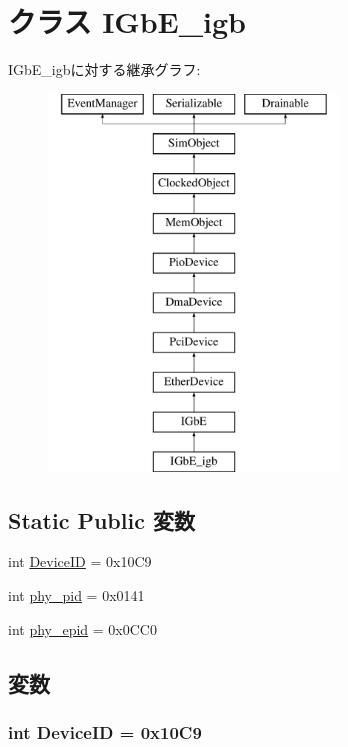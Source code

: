 \hypertarget{classEthernet_1_1IGbE__igb}{
\section{クラス IGbE\_\-igb}
\label{classEthernet_1_1IGbE__igb}
}
IGbE\_\-igbに対する継承グラフ:\begin{figure}[H]
\begin{center}
\leavevmode
\includegraphics[height=10cm]{classEthernet_1_1IGbE__igb}
\end{center}
\end{figure}
\subsection*{Static Public 変数}
\begin{DoxyCompactItemize}
\item 
int \hyperlink{classEthernet_1_1IGbE__igb_a4a8ed9a0233fc6d0ce178569c4de25d0}{DeviceID} = 0x10C9
\item 
int \hyperlink{classEthernet_1_1IGbE__igb_a229cca8e73c20d1d9c9089d20967f7fa}{phy\_\-pid} = 0x0141
\item 
int \hyperlink{classEthernet_1_1IGbE__igb_a5bb971e985d09a29903843736a36c7d8}{phy\_\-epid} = 0x0CC0
\end{DoxyCompactItemize}


\subsection{変数}
\hypertarget{classEthernet_1_1IGbE__igb_a4a8ed9a0233fc6d0ce178569c4de25d0}{
\subsubsection[{DeviceID}]{\setlength{\rightskip}{0pt plus 5cm}int {\bf DeviceID} = 0x10C9}}
\label{classEthernet_1_1IGbE__igb_a4a8ed9a0233fc6d0ce178569c4de25d0}


